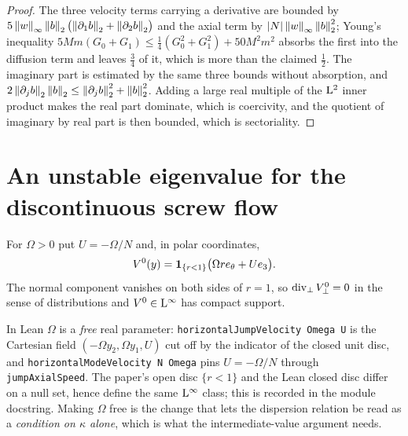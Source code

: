 \begin{proof}
  \leanok
  The three velocity terms carrying a derivative are bounded by
  $5\left\|w\right\|_\infty\left\|b\right\|_2\bigl(\left\|\partial_1b\right\|_2+\left\|\partial_2b\right\|_2\bigr)$ and the
  axial term by $\left\lvert N\right\rvert\left\|w\right\|_\infty\left\|b\right\|_2^2$; Young's inequality
  $5Mm(G_0+G_1)\leq\tfrac14(G_0^2+G_1^2)+50M^2m^2$ absorbs the first into the diffusion
  term and leaves $\tfrac34$ of it, which is more than the claimed $\tfrac12$.  The
  imaginary part is estimated by the same three bounds without absorption, and
  $2\left\|\partial_jb\right\|_2\left\|b\right\|_2\leq\left\|\partial_jb\right\|_2^2+\left\|b\right\|_2^2$.  Adding a large
  real multiple of the $\mathrm{L}^2$ inner product makes the real part dominate, which is
  coercivity, and the quotient of imaginary by real part is then bounded, which is
  sectoriality.
\end{proof}

\section{An unstable eigenvalue for the discontinuous screw flow}

\begin{definition}
  \label{def:local:jump-flow}
  \leanok
  For $\Omega>0$ put $U=-\Omega/N$ and, in polar coordinates,
  \begin{equation}
    V^0(y)=\mathbf{1}_{\{r<1\}}\bigl(\Omega re_\theta+Ue_3\bigr).
    \label{eq:local:jump-flow}
  \end{equation}
  The normal component vanishes on both sides of $r=1$, so
  $\operatorname{div}_\perp V^0_\perp=0$ in the sense of distributions and $V^0\in\mathrm{L}^\infty$ has
  compact support.
\end{definition}

In Lean $\Omega$ is a \emph{free} real parameter: \texttt{horizontalJumpVelocity Omega U}
is the Cartesian field $(-\Omega y_2,\Omega y_1,U)$ cut off by the indicator of the closed
unit disc, and \texttt{horizontalModeVelocity N Omega} pins $U=-\Omega/N$ through
\texttt{jumpAxialSpeed}.  The paper's open disc $\{r<1\}$ and the Lean closed disc
differ on a null set, hence define the same $\mathrm{L}^\infty$ class; this is recorded in the
module docstring.  Making $\Omega$ free is the change that lets the dispersion relation be
read as a \emph{condition on $\kappa$ alone}, which is what the intermediate-value
argument needs.

